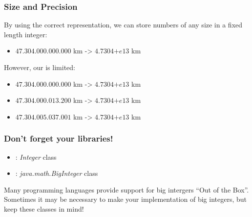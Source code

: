 \documentclass{beamer}
\begin{document}
\begin{frame}
  \frametitle{Size and Precision}
  \begin{block}{}
    By using the correct representation, we can store numbers of any
    size in a fixed length integer:
  \end{block}

  \bigskip

  \begin{itemize}
  \item $47.304.000.000.000$ km -> $4.7304{+e}13$ km    
  \end{itemize}
  
  \bigskip

  {\small
  \begin{block}{}
    However, our  is limited:
  \end{block}}

  {\small
  \begin{itemize}
  \item $47.304.000.000.000$ km -> $4.7304{+e}13$ km
  \item $47.304.000.013.200$ km -> $4.7304{+e}13$ km
  \item $47.304.005.037.001$ km -> $4.7304{+e}13$ km
  \end{itemize}}
\end{frame}

\begin{frame}
  \frametitle{Don't forget your libraries!}
  \begin{itemize}
    \item {}: \emph{Integer} class
    \item {}: \emph{java.math.BigInteger} class
  \end{itemize}
  \bigskip

  Many programming languages provide support for big intergers ``Out
  of the Box''. Sometimes it may be necessary to make your
  implementation of big integers, but keep these classes in mind!
\end{frame}
\end{document}
